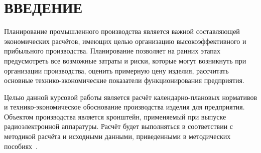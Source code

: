 \section*{ВВЕДЕНИЕ}

Планирование промышленного производства является важной составляющей 
экономических расчётов, имеющих целью организацию высокоэффективного 
и прибыльного производства.
Планирование позволяет на ранних этапах предусмотреть все возможные затраты и
риски, которые могут возникнуть при организации производства,
оценить примерную цену изделия,
рассчитать основные технико-экономические показатели функционирования предприятия.

Целью данной курсовой работы является расчёт календарно-плановых нормативов
и технико-экономическое обоснование производства изделия для предприятия.
Объектом производства является кронштейн, применяемый при выпуске
радиоэлектронной аппаратуры. 
Расчёт будет выполняться в соответствии с методикой расчёта и 
исходными данными, приведенными в методических пособиях~\cite{opiup_1,opiup_2}.
